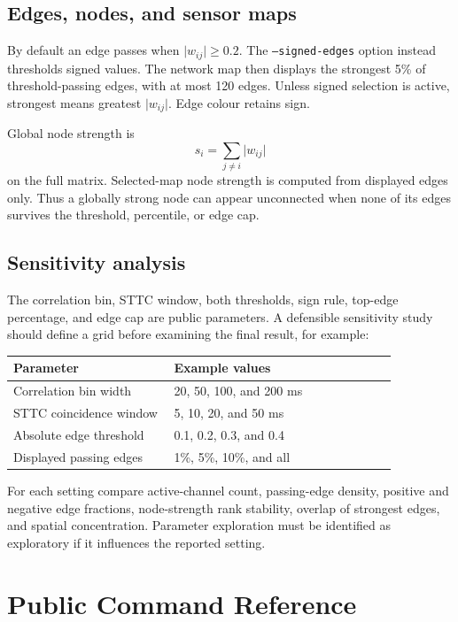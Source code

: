 \documentclass[11pt,a4paper]{article}
\newcommand{\code}[1]{\texttt{#1}}
\begin{document}
\subsection{Edges, nodes, and sensor maps}

By default an edge passes when \(\lvert w_{ij}\rvert\geq0.2\). The
\code{--signed-edges} option instead thresholds signed values. The network map
then displays the strongest 5\% of threshold-passing edges, with at most 120
edges. Unless signed selection is active, strongest means greatest
\(\lvert w_{ij}\rvert\). Edge colour retains sign.

Global node strength is
\[
  s_i=\sum_{j\ne i}\lvert w_{ij}\rvert
\]
on the full matrix. Selected-map node strength is computed from displayed edges
only. Thus a globally strong node can appear unconnected when none of its edges
survives the threshold, percentile, or edge cap.

\subsection{Sensitivity analysis}

The correlation bin, STTC window, both thresholds, sign rule, top-edge
percentage, and edge cap are public parameters. A defensible sensitivity study
should define a grid before examining the final result, for example:

\begin{longtable}{p{0.36\linewidth}p{0.50\linewidth}}
\toprule
Parameter & Example values \\
\midrule
Correlation bin width & 20, 50, 100, and 200 ms \\
STTC coincidence window & 5, 10, 20, and 50 ms \\
Absolute edge threshold & 0.1, 0.2, 0.3, and 0.4 \\
Displayed passing edges & 1\%, 5\%, 10\%, and all \\
\bottomrule
\end{longtable}

For each setting compare active-channel count, passing-edge density, positive
and negative edge fractions, node-strength rank stability, overlap of strongest
edges, and spatial concentration. Parameter exploration must be identified as
exploratory if it influences the reported setting.

\section{Public Command Reference}
\end{document}
